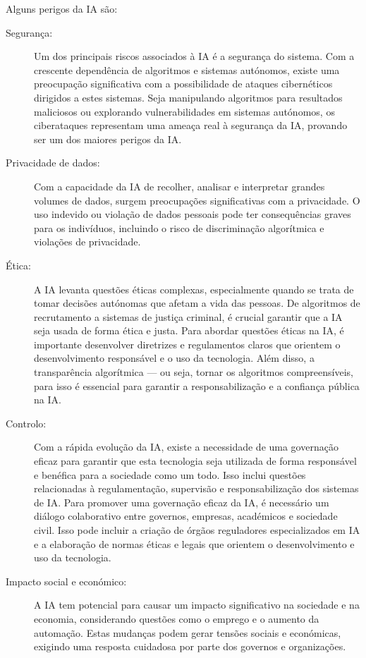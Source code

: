 \documentclass{report}
\begin{document}
Alguns perigos da \ac{IA} são:
\begin{description}
    \item[Segurança:]
    
    Um dos principais riscos associados à \ac{IA} é a segurança do sistema. Com a crescente dependência de algoritmos e sistemas autónomos, existe uma preocupação significativa com a possibilidade de ataques cibernéticos dirigidos a estes sistemas.
    Seja manipulando algoritmos para resultados maliciosos ou explorando vulnerabilidades em sistemas autónomos, os ciberataques representam uma ameaça real à segurança da \ac{IA}, provando ser um dos maiores perigos da \ac{IA}.
    \item[Privacidade de dados:]
    
    Com a capacidade da \ac{IA} de recolher, analisar e interpretar grandes volumes de dados, surgem preocupações significativas com a privacidade. O uso indevido ou violação de dados pessoais pode ter consequências graves para os indivíduos, incluindo o risco de discriminação algorítmica e violações de privacidade.
    
    \clearpage

    
    \item[Ética:]
    
    A \ac{IA} levanta questões éticas complexas, especialmente quando se trata de tomar decisões autónomas que afetam a vida das pessoas. De algoritmos de recrutamento a sistemas de justiça criminal, é crucial garantir que a \ac{IA} seja usada de forma ética e justa.
    Para abordar questões éticas na \ac{IA}, é importante desenvolver diretrizes e regulamentos claros que orientem o desenvolvimento responsável e o uso da tecnologia. Além disso, a transparência algorítmica — ou seja, tornar os algoritmos compreensíveis, para isso é essencial para garantir a responsabilização e a confiança pública na \ac{IA}.
    \item[Controlo:]
    
    Com a rápida evolução da \ac{IA}, existe a necessidade de uma governação eficaz para garantir que esta tecnologia seja utilizada de forma responsável e benéfica para a sociedade como um todo. Isso inclui questões relacionadas à regulamentação, supervisão e responsabilização dos sistemas de \ac{IA}.
    Para promover uma governação eficaz da \ac{IA}, é necessário um diálogo colaborativo entre governos, empresas, académicos e sociedade civil. Isso pode incluir a criação de órgãos reguladores especializados em \ac{IA} e a elaboração de normas éticas e legais que orientem o desenvolvimento e uso da tecnologia.
    \item[Impacto social e económico:]
    
    A \ac{IA} tem potencial para causar um impacto significativo na sociedade e na economia, considerando questões como o emprego e o aumento da automação. Estas mudanças podem gerar tensões sociais e económicas, exigindo uma resposta cuidadosa por parte dos governos e organizações.
\end{description}
\end{document}

